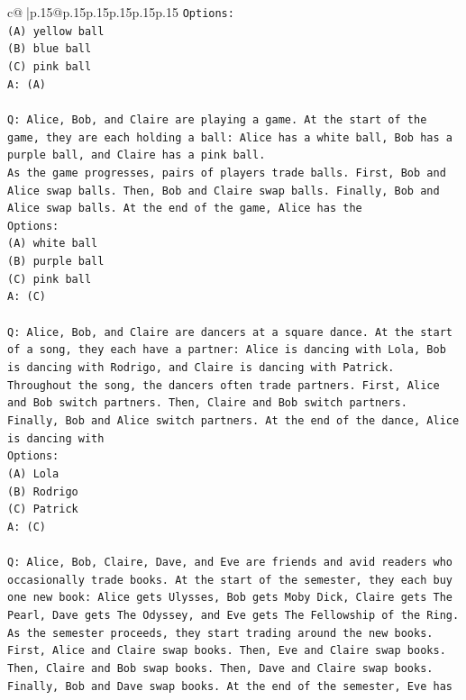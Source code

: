 \documentclass{article}
\begin{document}
{\begin{supertabular}{c@{$\;$}|p{.15\linewidth}@{}p{.15\linewidth}p{.15\linewidth}p{.15\linewidth}p{.15\linewidth}p{.15\linewidth}}
{{{\texttt{Options:} \\
\texttt{(A) yellow ball} \\
\texttt{(B) blue ball} \\
\texttt{(C) pink ball} \\
\texttt{A: (A)} \\
\\ 
\texttt{Q: Alice, Bob, and Claire are playing a game. At the start of the game, they are each holding a ball: Alice has a white ball, Bob has a purple ball, and Claire has a pink ball.} \\
\texttt{As the game progresses, pairs of players trade balls. First, Bob and Alice swap balls. Then, Bob and Claire swap balls. Finally, Bob and Alice swap balls. At the end of the game, Alice has the} \\
\texttt{Options:} \\
\texttt{(A) white ball} \\
\texttt{(B) purple ball} \\
\texttt{(C) pink ball} \\
\texttt{A: (C)} \\
\\ 
\texttt{Q: Alice, Bob, and Claire are dancers at a square dance. At the start of a song, they each have a partner: Alice is dancing with Lola, Bob is dancing with Rodrigo, and Claire is dancing with Patrick.} \\
\texttt{Throughout the song, the dancers often trade partners. First, Alice and Bob switch partners. Then, Claire and Bob switch partners. Finally, Bob and Alice switch partners. At the end of the dance, Alice is dancing with} \\
\texttt{Options:} \\
\texttt{(A) Lola} \\
\texttt{(B) Rodrigo} \\
\texttt{(C) Patrick} \\
\texttt{A: (C)} \\
\\ 
\texttt{Q: Alice, Bob, Claire, Dave, and Eve are friends and avid readers who occasionally trade books. At the start of the semester, they each buy one new book: Alice gets Ulysses, Bob gets Moby Dick, Claire gets The Pearl, Dave gets The Odyssey, and Eve gets The Fellowship of the Ring.} \\
\texttt{As the semester proceeds, they start trading around the new books. First, Alice and Claire swap books. Then, Eve and Claire swap books. Then, Claire and Bob swap books. Then, Dave and Claire swap books. Finally, Bob and Dave swap books. At the end of the semester, Eve has} \\
}}}
\end{supertabular}}
\end{document}
